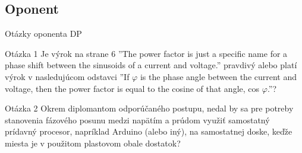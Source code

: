 \documentclass[hyperref={unicode}]{beamer}
\begin{document}
\subsection{Oponent}
\label{sub:Oponent}

\begin{frame}{Otázky oponenta DP}
	\begin{block}{Otázka 1}
		Je výrok na strane 6 ''The power factor is just a specific name for a phase shift between the sinusoids of a current and voltage.'' pravdivý alebo platí výrok v nasledujúcom odstavci ''If $\varphi$ is the phase angle between the current and voltage, then the power factor is equal to the cosine of that angle, cos $\varphi$.''?
	\end{block}

	\begin{block}{Otázka 2}
		Okrem diplomantom odporúčaného postupu, nedal by sa pre potreby stanovenia fázového posunu medzi napätím a prúdom využiť samostatný prídavný procesor, napríklad Arduino (alebo iný), na samostatnej doske, keďže miesta je v použitom plastovom obale dostatok?
	\end{block}
\end{frame}
\end{document}
